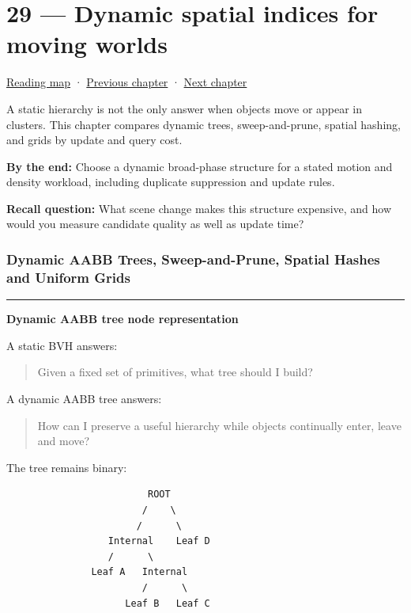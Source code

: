 \hypertarget{06-engine-ii-ch029}{}
\section{29 --- Dynamic spatial indices for moving worlds}\label{dynamic-spatial-indices-for-moving-worlds}

\href{Chapter\%20Edition/03\%20-\%20Game\%20Engine/00\%20-\%20Reading\%20Map}{Reading map} · \hyperref[06-engine-ii-ch028]{Previous chapter} · \hyperref[06-engine-ii-ch030]{Next chapter}

A static hierarchy is not the only answer when objects move or appear in clusters. This chapter compares dynamic trees, sweep-and-prune, spatial hashing, and grids by update and query cost.

\textbf{By the end:} Choose a dynamic broad-phase structure for a stated motion and density workload, including duplicate suppression and update rules.

\textbf{Recall question:} What scene change makes this structure expensive, and how would you measure candidate quality as well as update time?

\subsubsection{Dynamic AABB Trees, Sweep-and-Prune, Spatial Hashes and Uniform Grids}\label{dynamic-aabb-trees-sweep-and-prune-spatial-hashes-and-uniform-grids}

\begin{center}\rule{0.5\linewidth}{0.5pt}\end{center}

\textbf{Dynamic AABB tree node representation}

A static BVH answers:

\begin{quote}
Given a fixed set of primitives, what tree should I build?
\end{quote}

A dynamic AABB tree answers:

\begin{quote}
How can I preserve a useful hierarchy while objects continually enter, leave and move?
\end{quote}

The tree remains binary:

\begin{verbatim}
                         ROOT
                        /    \
                       /      \
                  Internal    Leaf D
                  /      \
               Leaf A   Internal
                        /      \
                     Leaf B   Leaf C
\end{verbatim}

